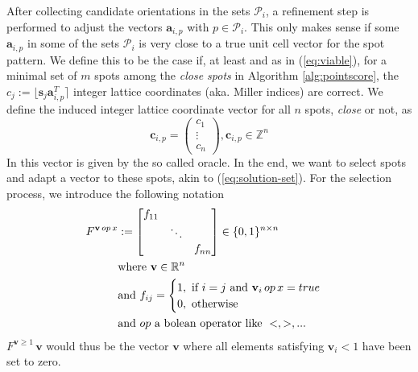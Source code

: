 \documentclass[a4paper,10pt]{article}
\newcommand{\vect}[1]{\mathbf{#1}}
\newcommand{\round}[1]{\lfloor #1 \rceil}
\newcommand{\filter}[1]{F^{#1}}
\begin{document}
After collecting candidate orientations in the sets $\mathcal{P}_i$, a refinement step is performed to adjust the vectors $\vect{a}_{i,p}$ with $p\in \mathcal{P}_i$. This only makes sense if some $\vect{a}_{i,p}$ in some of the sets $\mathcal{P}_i$ is very close to a true unit cell vector for the spot pattern. We define this to be the case if, at least and as in (\ref{eq:viable}), for a minimal set of $m$ spots among the \emph{close spots} in Algorithm \ref{alg:pointscore}, the $c_j := \round{\vect{s}_j \vect{a}_{i,p}^T}$ integer lattice coordinates (aka. Miller indices) are correct. We define the induced integer lattice coordinate vector for all $n$ spots, \emph{close} or not, as
%
\[
\vect{c}_{i,p} = \begin{pmatrix} c_1 \\ \vdots \\ c_n \end{pmatrix}, \vect{c}_{i,p}\in \mathbb{Z}^{n}
\]
%
In \cite{toro-indexer} this vector is given by the so called oracle. In the end, we want to select spots and adapt a vector to these spots, akin to (\ref{eq:solution-set}). For the selection process, we introduce the following notation
%
\begin{align}
\filter{\vect{v}\, op\, x} &:= \begin{bmatrix}
  f_{11} &        &        \\
         & \ddots &        \\
         &        & f_{nn}
\end{bmatrix} \in \{0,1\}^{n\times n} \\
&\text{where } \vect{v} \in \mathbb{R}^n \notag \\
&\text{and } f_{ij} = \begin{cases}
  1,\text{ if } i=j\text{ and }\vect{v}_i\, op\, x = true \\
  0,\text{ otherwise}
\end{cases}  \notag \\
&\text{and }op\text{ a bolean operator like } <, >, ... \notag
\end{align}
%
$\filter{\vect{v} \geq 1}\,\vect{v}$ would thus be the vector $\vect{v}$ where all elements satisfying $\vect{v}_i < 1$ have been set to zero.
\end{document}
